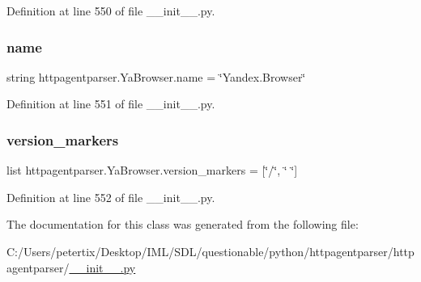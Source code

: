 Definition at line 550 of file \+\_\+\+\_\+init\+\_\+\+\_\+.\+py.

\hypertarget{classhttpagentparser_1_1_ya_browser_ad6c6da12eedb20c135fe1dd981cb57e5}{}\label{classhttpagentparser_1_1_ya_browser_ad6c6da12eedb20c135fe1dd981cb57e5} 
\subsubsection{\texorpdfstring{name}{name}}
{\footnotesize\ttfamily string httpagentparser.\+Ya\+Browser.\+name = \char`\"{}Yandex.\+Browser\char`\"{}\hspace{0.3cm}{\ttfamily [static]}}



Definition at line 551 of file \+\_\+\+\_\+init\+\_\+\+\_\+.\+py.

\hypertarget{classhttpagentparser_1_1_ya_browser_a423bb45062f5d0f18ff4a246b82f1ea0}{}\label{classhttpagentparser_1_1_ya_browser_a423bb45062f5d0f18ff4a246b82f1ea0} 
\subsubsection{\texorpdfstring{version\+\_\+markers}{version\_markers}}
{\footnotesize\ttfamily list httpagentparser.\+Ya\+Browser.\+version\+\_\+markers = \mbox{[}\char`\"{}/\char`\"{}, \char`\"{} \char`\"{}\mbox{]}\hspace{0.3cm}{\ttfamily [static]}}



Definition at line 552 of file \+\_\+\+\_\+init\+\_\+\+\_\+.\+py.



The documentation for this class was generated from the following file\+:\begin{DoxyCompactItemize}
\item 
C\+:/\+Users/petertix/\+Desktop/\+I\+M\+L/\+S\+D\+L/questionable/python/httpagentparser/httpagentparser/\hyperlink{____init_____8py}{\+\_\+\+\_\+init\+\_\+\+\_\+.\+py}\end{DoxyCompactItemize}
